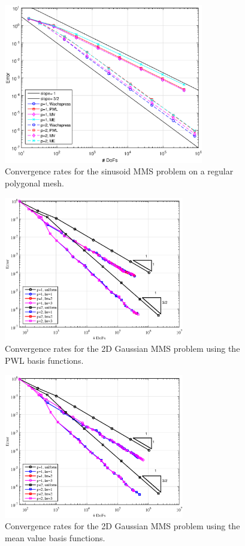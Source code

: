 \begin{figure}
\centering
\includegraphics[width=0.775\textwidth]{figures/sec_BF/TransMMS_Sine_poly_err.eps}
\caption{Convergence rates for the sinusoid MMS problem on a regular polygonal mesh.}
\label{fig::BF_Results_MMS_Sine_poly}
\end{figure}

\begin{figure}
\centering
\includegraphics[width=0.70\textwidth]{figures/sec_BF/TransportMMS_Gauss2D_PWL_Err.eps}
\caption{Convergence rates for the 2D Gaussian MMS problem using the PWL basis functions.}
\label{fig::BF_Results_MMS_Gauss2D_cart}
\end{figure}

\begin{figure}
\centering
\includegraphics[width=0.70\textwidth]{figures/sec_BF/TransportMMS_Gauss2D_MV_Err.eps}
\caption{Convergence rates for the 2D Gaussian MMS problem using the mean value basis functions.}
\label{fig::BF_Results_MMS_Gauss2D_tri}
\end{figure}

